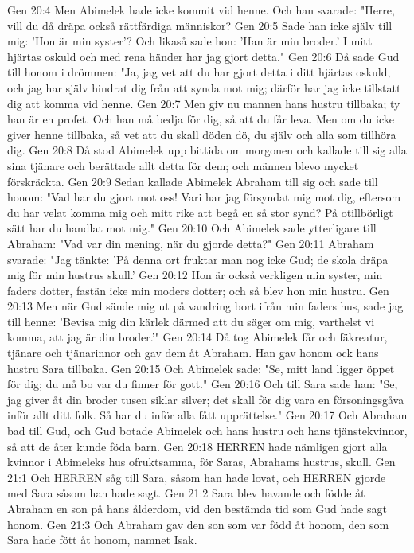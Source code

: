 Gen 20:4  Men Abimelek hade icke kommit vid henne. Och han svarade: "Herre, vill du då dräpa också rättfärdiga människor?
Gen 20:5  Sade han icke själv till mig: 'Hon är min syster'? Och likaså sade hon: 'Han är min broder.' I mitt hjärtas oskuld och med rena händer har jag gjort detta."
Gen 20:6  Då sade Gud till honom i drömmen: "Ja, jag vet att du har gjort detta i ditt hjärtas oskuld, och jag har själv hindrat dig från att synda mot mig; därför har jag icke tillstatt dig att komma vid henne.
Gen 20:7  Men giv nu mannen hans hustru tillbaka; ty han är en profet. Och han må bedja för dig, så att du får leva. Men om du icke giver henne tillbaka, så vet att du skall döden dö, du själv och alla som tillhöra dig.
Gen 20:8  Då stod Abimelek upp bittida om morgonen och kallade till sig alla sina tjänare och berättade allt detta för dem; och männen blevo mycket förskräckta.
Gen 20:9  Sedan kallade Abimelek Abraham till sig och sade till honom: "Vad har du gjort mot oss! Vari har jag försyndat mig mot dig, eftersom du har velat komma mig och mitt rike att begå en så stor synd? På otillbörligt sätt har du handlat mot mig."
Gen 20:10  Och Abimelek sade ytterligare till Abraham: "Vad var din mening, när du gjorde detta?"
Gen 20:11  Abraham svarade: "Jag tänkte: 'På denna ort fruktar man nog icke Gud; de skola dräpa mig för min hustrus skull.'
Gen 20:12  Hon är också verkligen min syster, min faders dotter, fastän icke min moders dotter; och så blev hon min hustru.
Gen 20:13  Men när Gud sände mig ut på vandring bort ifrån min faders hus, sade jag till henne: 'Bevisa mig din kärlek därmed att du säger om mig, varthelst vi komma, att jag är din broder.'"
Gen 20:14  Då tog Abimelek får och fäkreatur, tjänare och tjänarinnor och gav dem åt Abraham. Han gav honom ock hans hustru Sara tillbaka.
Gen 20:15  Och Abimelek sade: "Se, mitt land ligger öppet för dig; du må bo var du finner för gott."
Gen 20:16  Och till Sara sade han: "Se, jag giver åt din broder tusen siklar silver; det skall för dig vara en försoningsgåva inför allt ditt folk. Så har du inför alla fått upprättelse."
Gen 20:17  Och Abraham bad till Gud, och Gud botade Abimelek och hans hustru och hans tjänstekvinnor, så att de åter kunde föda barn.
Gen 20:18  HERREN hade nämligen gjort alla kvinnor i Abimeleks hus ofruktsamma, för Saras, Abrahams hustrus, skull.
Gen 21:1  Och HERREN såg till Sara, såsom han hade lovat, och HERREN gjorde med Sara såsom han hade sagt.
Gen 21:2  Sara blev havande och födde åt Abraham en son på hans ålderdom, vid den bestämda tid som Gud hade sagt honom.
Gen 21:3  Och Abraham gav den son som var född åt honom, den som Sara hade fött åt honom, namnet Isak.

